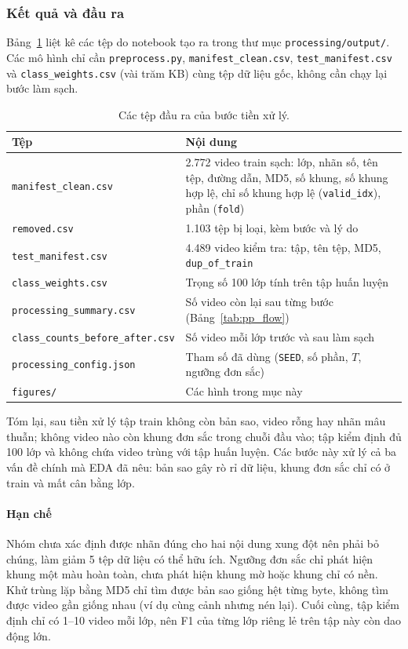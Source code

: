 \subsubsection{Kết quả và đầu ra}
\label{subsec:pp_output}

Bảng~\ref{tab:pp_outputs} liệt kê các tệp do notebook tạo ra trong thư mục \texttt{processing/output/}. Các mô hình chỉ cần \texttt{preprocess.py}, \texttt{manifest\_clean.csv}, \texttt{test\_manifest.csv} và \texttt{class\_weights.csv} (vài trăm KB) cùng tệp dữ liệu gốc, không cần chạy lại bước làm sạch.

\begin{table}[H]
  \centering
  \caption{Các tệp đầu ra của bước tiền xử lý.}
  \label{tab:pp_outputs}
  \small
  \begin{tabular}{@{}p{}p{}@{}}
    \toprule
    \textbf{Tệp} & \textbf{Nội dung} \\
    \midrule
    \texttt{manifest\_clean.csv} & 2.772 video train sạch: lớp, nhãn số, tên tệp, đường dẫn, MD5, số khung, số khung hợp lệ, chỉ số khung hợp lệ (\texttt{valid\_idx}), phần (\texttt{fold}) \\
    \texttt{removed.csv} & 1.103 tệp bị loại, kèm bước và lý do \\
    \texttt{test\_manifest.csv} & 4.489 video kiểm tra: tập, tên tệp, MD5, \texttt{dup\_of\_train} \\
    \texttt{class\_weights.csv} & Trọng số 100 lớp tính trên tập huấn luyện \\
    \texttt{processing\_summary.csv} & Số video còn lại sau từng bước (Bảng~\ref{tab:pp_flow}) \\
    \texttt{class\_counts\_before\_after.csv} & Số video mỗi lớp trước và sau làm sạch \\
    \texttt{processing\_config.json} & Tham số đã dùng (\texttt{SEED}, số phần, $T$, ngưỡng đơn sắc) \\
    \texttt{figures/} & Các hình trong mục này \\
    \bottomrule
  \end{tabular}
\end{table}

Tóm lại, sau tiền xử lý tập train không còn bản sao, video rỗng hay nhãn mâu thuẫn; không video nào còn khung đơn sắc trong chuỗi đầu vào; tập kiểm định đủ 100 lớp và không chứa video trùng với tập huấn luyện. Các bước này xử lý cả ba vấn đề chính mà EDA đã nêu: bản sao gây rò rỉ dữ liệu, khung đơn sắc chỉ có ở train và mất cân bằng lớp.

\paragraph{Hạn chế} Nhóm chưa xác định được nhãn đúng cho hai nội dung xung đột nên phải bỏ chúng, làm giảm 5 tệp dữ liệu có thể hữu ích. Ngưỡng đơn sắc chỉ phát hiện khung một màu hoàn toàn, chưa phát hiện khung mờ hoặc khung chỉ có nền. Khử trùng lặp bằng MD5 chỉ tìm được bản sao giống hệt từng byte, không tìm được video gần giống nhau (ví dụ cùng cảnh nhưng nén lại). Cuối cùng, tập kiểm định chỉ có 1--10 video mỗi lớp, nên F1 của từng lớp riêng lẻ trên tập này còn dao động lớn.
